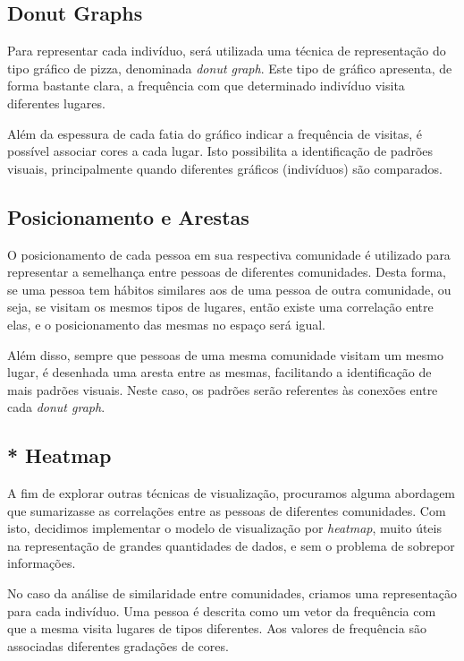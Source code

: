 \documentclass[12pt]{article}
\begin{document}
\subsection{Donut Graphs}
Para representar cada indivíduo, será utilizada uma técnica de representação
do tipo gráfico de pizza, denominada {\it donut graph}. Este tipo de gráfico 
apresenta, de forma bastante clara, a frequência com que determinado indivíduo
visita diferentes lugares.

Além da espessura de cada fatia do gráfico indicar a frequência de visitas,
é possível associar cores a cada lugar. Isto possibilita a identificação
de padrões visuais, principalmente quando diferentes gráficos (indivíduos)
são comparados.

\subsection{Posicionamento e Arestas}
O posicionamento de cada pessoa em sua respectiva comunidade é utilizado
para representar a semelhança entre pessoas de diferentes comunidades.
Desta forma, se uma pessoa tem hábitos similares aos de uma pessoa de outra
comunidade, ou seja, se visitam os mesmos tipos de lugares, então existe
uma correlação entre elas, e o posicionamento das mesmas no espaço será igual.

Além disso, sempre que pessoas de uma mesma comunidade visitam um mesmo lugar,
é desenhada uma aresta entre as mesmas, facilitando a identificação
de mais padrões visuais. Neste caso, os padrões serão referentes às conexões
entre cada {\it donut graph}.

\subsection{* Heatmap}
A fim de explorar outras técnicas de visualização, procuramos alguma
abordagem que sumarizasse as correlações entre as pessoas de diferentes
comunidades. Com isto, decidimos implementar o modelo de visualização
por {\it heatmap}, muito úteis na representação de grandes quantidades
de dados, e sem o problema de sobrepor informações.

No caso da análise de similaridade entre comunidades, criamos uma representação
para cada indivíduo. Uma pessoa é descrita como um vetor da frequência com
que a mesma visita lugares de tipos diferentes. Aos valores de frequência
são associadas diferentes gradações de cores. 

\end{document}
